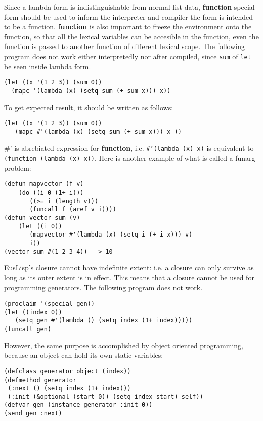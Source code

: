 Since a lambda form is indistinguishable from normal list data,
{\bf function} special form should be used to inform the interpreter and
compiler the form is intended to be a function.
{\bf function} is also important to freeze the environment onto the function,
so that all the lexical variables can be accesible in the function,
even the function is passed to another function of different lexical scope.
The following program does not work either interpretedly nor after compiled,
since {\tt sum} of {\tt let} be seen inside lambda form.

\begin{verbatim}
(let ((x '(1 2 3)) (sum 0))
  (mapc '(lambda (x) (setq sum (+ sum x))) x))
\end{verbatim}

To get expected result, it should be written as follows:
\begin{verbatim}
(let ((x '(1 2 3)) (sum 0))
   (mapc #'(lambda (x) (setq sum (+ sum x))) x ))
\end{verbatim}

\#' is abrebiated expression for {\bf function},
i.e. {\tt \#'(lambda (x) x)} is equivalent to
{\tt (function (lambda (x) x))}.
Here is another example of what is called a funarg problem:

\begin{verbatim}
(defun mapvector (f v)
    (do ((i 0 (1+ i)))
       ((>= i (length v)))
       (funcall f (aref v i))))
(defun vector-sum (v)
    (let ((i 0))
       (mapvector #'(lambda (x) (setq i (+ i x))) v)
       i))
(vector-sum #(1 2 3 4)) --> 10 
\end{verbatim}

EusLisp's closure cannot have indefinite extent:
i.e. a closure can only survive as long as its outer extent is in effect.
This means that a closure cannot be used for programming generators.
The following program does not work.

\begin{verbatim}
(proclaim '(special gen))
(let ((index 0))
   (setq gen #'(lambda () (setq index (1+ index)))))
(funcall gen)
\end{verbatim}

However, the same purpose is accomplished by object oriented programming,
because an object can hold its own static variables:
\begin{verbatim}
(defclass generator object (index))
(defmethod generator
 (:next () (setq index (1+ index)))
 (:init (&optional (start 0)) (setq index start) self))
(defvar gen (instance generator :init 0))
(send gen :next)
\end{verbatim}
\newpage